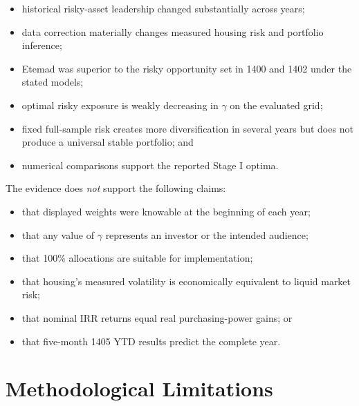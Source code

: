 \documentclass[11pt,a4paper]{article}
\begin{document}
\begin{itemize}
  \item historical risky-asset leadership changed substantially across years;
  \item data correction materially changes measured housing risk and portfolio inference;
  \item Etemad was superior to the risky opportunity set in 1400 and 1402 under the stated models;
  \item optimal risky exposure is weakly decreasing in $\gamma$ on the evaluated grid;
  \item fixed full-sample risk creates more diversification in several years but does not produce
  a universal stable portfolio; and
  \item numerical comparisons support the reported Stage I optima.
\end{itemize}

The evidence does \emph{not} support the following claims:

\begin{itemize}
  \item that displayed weights were knowable at the beginning of each year;
  \item that any value of $\gamma$ represents an investor or the intended audience;
  \item that 100\% allocations are suitable for implementation;
  \item that housing's measured volatility is economically equivalent to liquid market risk;
  \item that nominal IRR returns equal real purchasing-power gains; or
  \item that five-month 1405 YTD results predict the complete year.
\end{itemize}

\section{Methodological Limitations}
\end{document}
